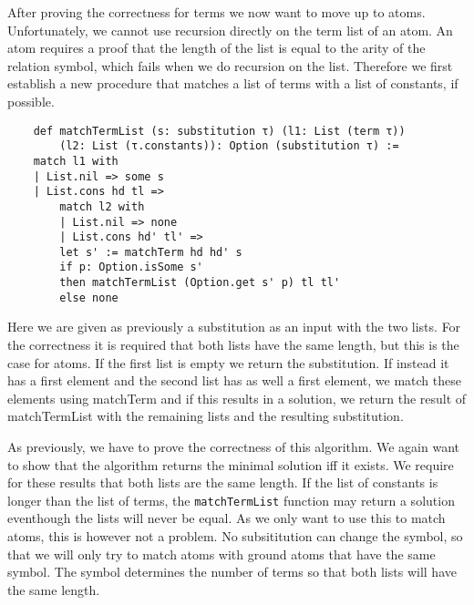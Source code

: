 After proving the correctness for terms we now want to move up to atoms. Unfortunately, we cannot use recursion directly on the term list of an atom. An atom requires a proof that the length of the list is equal to the arity of the relation symbol, which fails when we do recursion on the list. Therefore we first establish a new procedure that matches a list of terms with a list of constants, if possible.

\begin{lstlisting}
    def matchTermList (s: substitution τ) (l1: List (term τ))
        (l2: List (τ.constants)): Option (substitution τ) :=
    match l1 with
    | List.nil => some s
    | List.cons hd tl =>
        match l2 with
        | List.nil => none
        | List.cons hd' tl' =>
        let s' := matchTerm hd hd' s
        if p: Option.isSome s'
        then matchTermList (Option.get s' p) tl tl'
        else none
\end{lstlisting}

Here we are given as previously a substitution as an input with the two lists. For the correctness it is required that both lists have the same length, but this is the case for atoms. If the first list is empty we return the substitution. If instead it has a first element and the second list has as well a first element, we match these elements using matchTerm and if this results in a solution, we return the result of matchTermList with the remaining lists and the resulting substitution.

As previously, we have to prove the correctness of this algorithm. We again want to show that the algorithm returns the minimal solution iff it exists. We require for these results that both lists are the same length. If the list of constants is longer than the list of terms, the \texttt{matchTermList} function may return a solution eventhough the lists will never be equal. As we only want to use this to match atoms, this is however not a problem. No subsititution can change the symbol, so that we will only try to match atoms with ground atoms that have the same symbol. The symbol determines the number of terms so that both lists will have the same length.

